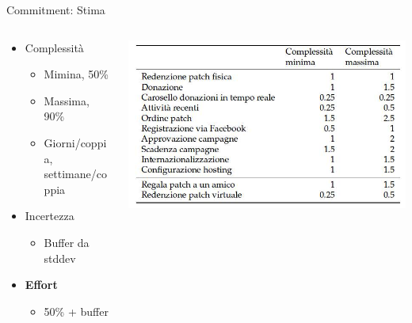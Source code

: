 \documentclass[compress, red, 14pt]{beamer}
\begin{document}
	\begin{frame}{Commitment: Stima}
		
		\begin{columns}[T]
		    \begin{column}{.5\textwidth}
		
				\begin{itemize}
					\item Complessità
					\begin{itemize}
						\item Mimina, 50\%
						\item Massima, 90\%
						\item Giorni/coppia, settimane/coppia
					\end{itemize}
					\item Incertezza
					\begin{itemize}
						\item Buffer da stddev
					\end{itemize}
				\end{itemize}

				\begin{itemize}
					\item \textbf{Effort}
					\begin{itemize}
						\item 50\% + buffer
					\end{itemize}
				\end{itemize}
		
		    \end{column}
		    \begin{column}{.5\textwidth}
				\hspace*{-0.6cm}
			    \includegraphics[scale=0.25]{images/effort.png}
		    \end{column}
		 \end{columns}
	
	\end{frame}
\end{document}
